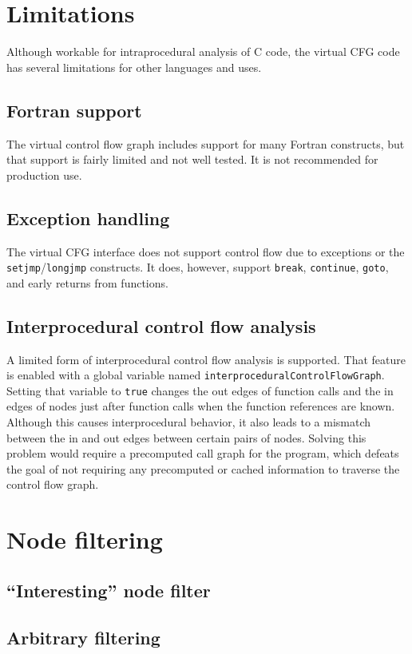 \section{Limitations}

Although workable for intraprocedural analysis of C code, the virtual CFG
code has several limitations for other languages and uses.

\subsection{Fortran support}

The virtual control flow graph includes support for many Fortran
constructs, but that support is fairly limited and not well tested.  It is
not recommended for production use.

\subsection{Exception handling}

The virtual CFG interface does not support control flow due to exceptions
or the \lstinline{setjmp}/\lstinline{longjmp} constructs.
It does, however, support \lstinline{break}, \lstinline{continue},
\lstinline{goto}, and early returns from functions.

\subsection{Interprocedural control flow analysis}

A limited form of interprocedural control flow analysis is supported.  That
feature is enabled with a global variable named
\lstinline{interproceduralControlFlowGraph}.  Setting that variable to
\lstinline{true} changes the out edges of function calls and the in edges
of nodes just after function calls when the function references are known.
Although this causes interprocedural behavior, it also leads to a mismatch
between the in and out edges between certain pairs of nodes.  Solving this
problem would require a precomputed call graph for the program, which
defeats the goal of not requiring any precomputed or cached information to
traverse the control flow graph.

\section{Node filtering}

\subsection{``Interesting'' node filter}
\label{interesting_node_filter}

\subsection{Arbitrary filtering}

